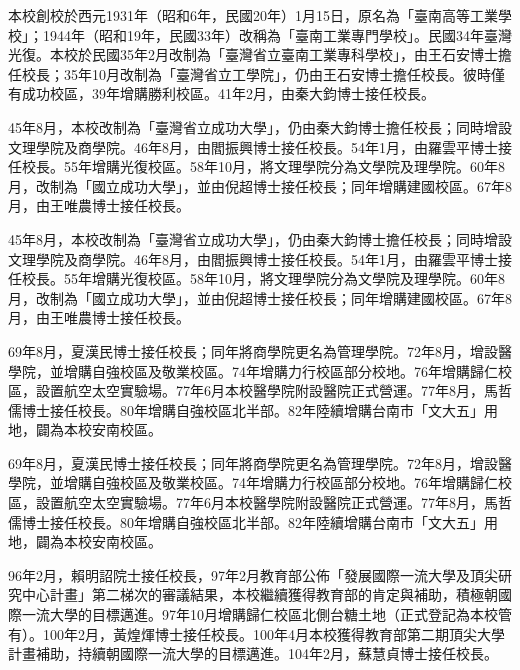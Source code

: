 
本校創校於西元1931年（昭和6年，民國20年）1月15日，原名為「臺南高等工業學校」；1944年（昭和19年，民國33年）改稱為「臺南工業專門學校」。民國34年臺灣光復。本校於民國35年2月改制為「臺灣省立臺南工業專科學校」，由王石安博士擔任校長；35年10月改制為「臺灣省立工學院」，仍由王石安博士擔任校長。彼時僅有成功校區，39年增購勝利校區。41年2月，由秦大鈞博士接任校長。

45年8月，本校改制為「臺灣省立成功大學」，仍由秦大鈞博士擔任校長；同時增設文理學院及商學院。46年8月，由閻振興博士接任校長。54年1月，由羅雲平博士接任校長。55年增購光復校區。58年10月，將文理學院分為文學院及理學院。60年8月，改制為「國立成功大學」，並由倪超博士接任校長；同年增購建國校區。67年8月，由王唯農博士接任校長。

45年8月，本校改制為「臺灣省立成功大學」，仍由秦大鈞博士擔任校長；同時增設文理學院及商學院。46年8月，由閻振興博士接任校長。54年1月，由羅雲平博士接任校長。55年增購光復校區。58年10月，將文理學院分為文學院及理學院。60年8月，改制為「國立成功大學」，並由倪超博士接任校長；同年增購建國校區。67年8月，由王唯農博士接任校長。

69年8月，夏漢民博士接任校長；同年將商學院更名為管理學院。72年8月，增設醫學院，並增購自強校區及敬業校區。74年增購力行校區部分校地。76年增購歸仁校區，設置航空太空實驗場。77年6月本校醫學院附設醫院正式營運。77年8月，馬哲儒博士接任校長。80年增購自強校區北半部。82年陸續增購台南市「文大五」用地，闢為本校安南校區。

69年8月，夏漢民博士接任校長；同年將商學院更名為管理學院。72年8月，增設醫學院，並增購自強校區及敬業校區。74年增購力行校區部分校地。76年增購歸仁校區，設置航空太空實驗場。77年6月本校醫學院附設醫院正式營運。77年8月，馬哲儒博士接任校長。80年增購自強校區北半部。82年陸續增購台南市「文大五」用地，闢為本校安南校區。

96年2月，賴明詔院士接任校長，97年2月教育部公佈「發展國際一流大學及頂尖研究中心計畫」第二梯次的審議結果，本校繼續獲得教育部的肯定與補助，積極朝國際一流大學的目標邁進。97年10月增購歸仁校區北側台糖土地（正式登記為本校管有）。100年2月，黃煌煇博士接任校長。100年4月本校獲得教育部第二期頂尖大學計畫補助，持續朝國際一流大學的目標邁進。104年2月，蘇慧貞博士接任校長。

